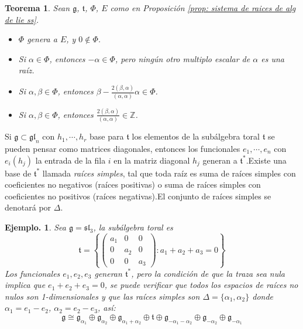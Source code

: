 \documentclass[11pt,a4paper]{article}
\newtheorem{theorem}{Teorema}
\newtheorem{example}{Ejemplo.}
\begin{document}
\begin{theorem}
Sean $\mathfrak{g}$, $\mathfrak{t}$, $\Phi$, $E$ como en Proposición \ref{prop: sistema de raices de alg de lie ss}.
\begin{itemize}
    \item $\Phi$ genera a $E$, y $0\not\in \Phi$.
    \item Si $\alpha\in \Phi$, entonces $-\alpha \in \Phi$, pero ningún otro multiplo escalar de $\alpha$ es una raíz. 
    \item Si $\alpha, \beta \in \Phi$, entonces $\beta- \frac{2(\beta, \alpha)}{(\alpha, \alpha)}\alpha \in \Phi$.
    \item Si $\alpha, \beta \in \Phi$, entonces $\frac{2(\beta, \alpha)}{(\alpha,\alpha)} \in \mathbb{Z}$.
\end{itemize}
\end{theorem}

Si $\mathfrak{g}\subset \mathfrak{gl}_n$ con $h_1, \cdots, h_r$ base para $\mathfrak{t}$ los elementos de la subálgebra toral $\mathfrak{t}$ se pueden pensar como matrices diagonales, entonces los funcionales $e_1,\cdots, e_n $ con $e_i (h_j)$ la entrada de la fila $i$ en la matriz diagonal $h_j$ generan a $\mathfrak{t}^*$.Existe una base de $\mathfrak{t}^*$ llamada \textit{raíces simples}, tal que toda raíz es suma de raíces simples con coeficientes no negativos (raíces positivas) o suma de raíces simples con coeficientes no positivos (raíces negativas).El conjunto de raíces simples se denotará por $\Delta$.
\begin{example}
Sea $\mathfrak{g}= \mathfrak{sl}_3$, la subálgebra toral es
$$\mathfrak{t}=\left\lbrace\begin{pmatrix}a_1 & 0  & 0\\
0 & a_2 & 0\\
0 & 0 & a_3\end{pmatrix} : a_1 + a_2+a_3=0 \right \rbrace$$
Los funcionales $e_1, e_2, e_3$ generan $\mathfrak{t}^*$, pero la condición de que la traza sea nula implica que $e_1+e_2+e_3=0$, se puede verificar que todos los espacios de raíces no nulos son 1-dimensionales y que las raíces simples son $\Delta=\{\alpha_1, \alpha_2 \}$ donde $\alpha_1=e_1-e_2$, $\alpha_2= e_2-e_3$, así: 
$$\mathfrak{g} \cong \mathfrak{g}_{\alpha_1}\oplus \mathfrak{g}_{\alpha_2} \oplus \mathfrak{g}_{\alpha_1+ \alpha_2}\oplus \mathfrak{t} \oplus \mathfrak{g}_{-\alpha_1-\alpha_2} \oplus \mathfrak{g}_{-\alpha_2} \oplus \mathfrak{g}_{-\alpha_1} $$
\end{example}
\end{document}
